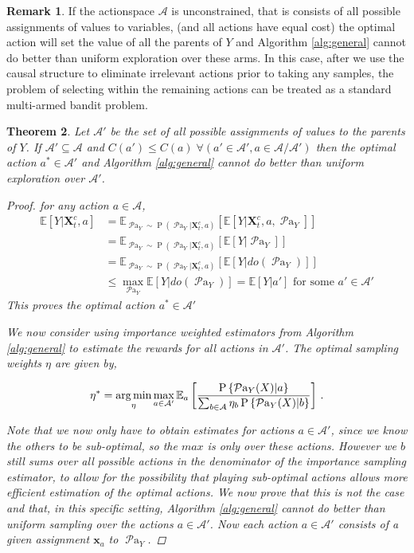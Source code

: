 \documentclass[11pt,a4paper,twoside]{report}
\newcommand{\EE}{\mathbb E}
\newcommand{\EEa}{\EE_a}
\newcommand{\Pn}[2]{\operatorname{P}\left\{#2|#1\right\}}
\newcommand{\calA}{\mathcal A}
\newcommand{\Esub}[2]{\mathbb E_{#1}\left[{#2}\right]}
\newcommand{\E}[1]{\mathbb E\left[{#1}\right]}
\newcommand{\argmin}{\operatornamewithlimits{arg\,min}}
\newcommand{\eq}[1]{\begin{align*}#1\end{align*}}
\renewcommand{\P}[1]{\operatorname{P}\left(#1\right)}
\newcommand{\parents}[1]{\operatorname{\mathcal{P}a}_{#1}}
\renewcommand{\vec}[1]{\boldsymbol{#1}}
\theoremstyle{plain}
\newtheorem{theorem}{Theorem}
\theoremstyle{definition}
\newtheorem{remark}[theorem]{Remark}
\begin{document}
\begin{remark} If the actionspace $\mathcal{A}$ is unconstrained, that is consists of all possible assignments of values to variables, (and all actions have equal cost) the optimal action will set the value of all the parents of $Y$ and Algorithm \ref{alg:general} cannot do better than uniform exploration over these arms. In this case, after we use the causal structure to eliminate irrelevant actions prior to taking any samples, the problem of selecting within the remaining actions can be treated as a standard multi-armed bandit problem. 
\end{remark} 

\vspace{0.5cm}
\begin{theorem}
\label{theorem:cb-intervene-all-parents}
Let $\mathcal{A'}$ be the set of all possible assignments of values to the parents of $Y$. If $\mathcal{A'} \subseteq \mathcal{A}$ and $C(a') \leq C(a) \; \forall (a' \in \mathcal{A'}, a \in \mathcal{A}/\mathcal{A'})$ then the optimal action $a^* \in \mathcal{A'}$ and Algorithm \ref{alg:general} cannot do better than uniform exploration over $\mathcal{A'}$.
\begin{proof}
for any action $a \in \mathcal{A}$, 
\eq{
 \E{Y|\vec{X}^c_t,a} &= \Esub{\parents{Y}\sim \P{\parents{Y}|\vec{X}^c_t,a}}{\E{Y|\vec{X}^c_t,a,\parents{Y}}} \\
 &= \Esub{\parents{Y}\sim \P{\parents{Y}|\vec{X}^c_t,a}}{\E{Y|\parents{Y}}}\\
 &= \Esub{\parents{Y}\sim \P{\parents{Y}|\vec{X}^c_t,a}}{\E{Y|do(\parents{Y})}}\\
 &\leq \max_{\parents{Y}}\E{Y|do(\parents{Y})} = \E{Y|a'} \text{ for some $a' \in \mathcal{A'}$}
}
This proves the optimal action $a^* \in \mathcal{A'}$

We now consider using importance weighted estimators from Algorithm \ref{alg:general} to estimate the rewards for all actions in $ \mathcal{A'}$. The optimal sampling weights $\eta$ are given by,

\eq{
\eta^*  = \argmin_\eta \max_{a \in \mathcal{A'}} \EEa \left[\frac{\Pn{a}{\parents{Y}(X)}}{\sum_{b \in \calA} \eta_b \Pn{b}{\parents{Y}(X)}}\right]\,.
}

Note that we now only have to obtain estimates for actions $a \in \mathcal{A'}$, since we know the others to be sub-optimal, so the $max$ is only over these actions. However we $b$ still sums over all possible actions in the denominator of the importance sampling estimator, to allow for the possibility that playing sub-optimal actions allows more efficient estimation of the optimal actions. We now prove that this is not the case and that, in this specific setting, Algorithm \ref{alg:general} cannot do better than uniform sampling over the actions $a \in \mathcal{A'}$. Now each action $a \in \mathcal{A'}$ consists of a given assignment $\vec{x}_a$ to $\parents{Y}$.


\end{proof}
\end{theorem}
\end{document}
